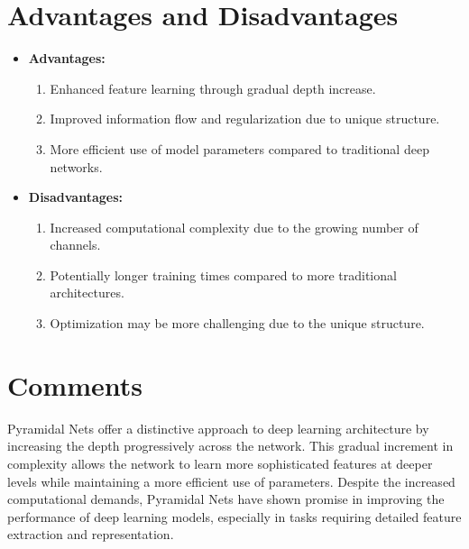\section{Advantages and Disadvantages}
\begin{itemize}
    \item \textbf{Advantages:}
    \begin{enumerate}
        \item Enhanced feature learning through gradual depth increase.
        \item Improved information flow and regularization due to unique structure.
        \item More efficient use of model parameters compared to traditional deep networks.
    \end{enumerate}
    \item \textbf{Disadvantages:}
    \begin{enumerate}
        \item Increased computational complexity due to the growing number of channels.
        \item Potentially longer training times compared to more traditional architectures.
        \item Optimization may be more challenging due to the unique structure.
    \end{enumerate}
\end{itemize}

\section{Comments}
Pyramidal Nets offer a distinctive approach to deep learning architecture by increasing the depth progressively across the network. This gradual increment in complexity allows the network to learn more sophisticated features at deeper levels while maintaining a more efficient use of parameters. Despite the increased computational demands, Pyramidal Nets have shown promise in improving the performance of deep learning models, especially in tasks requiring detailed feature extraction and representation.
